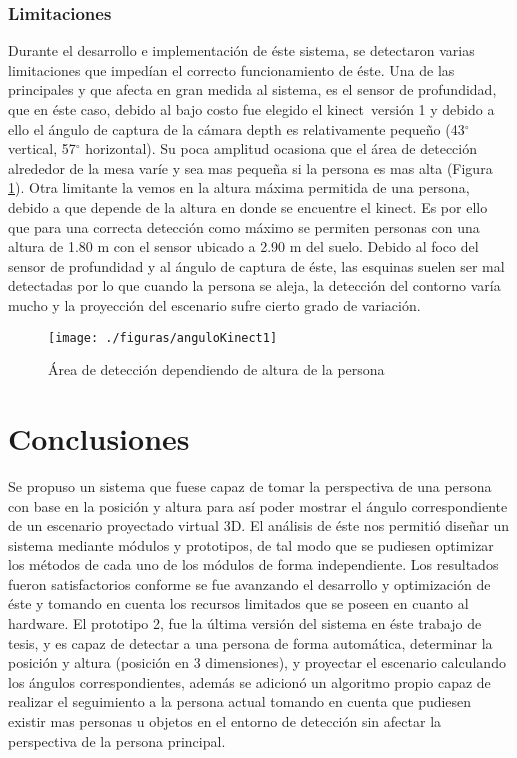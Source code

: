 \documentclass[a4paper,openright,12pt]{report}
\begin{document}
\subsection{Limitaciones}
Durante el desarrollo e implementación de éste sistema, se detectaron varias limitaciones que impedían el correcto funcionamiento de éste. Una de las principales y que afecta en gran medida al sistema, es el sensor de profundidad, que en éste caso, debido al bajo costo fue elegido el kinect\textcopyright\ versión 1 y debido a ello el ángulo de captura de la cámara depth es relativamente pequeño (43$^{\circ}$ vertical, 57$^{\circ}$ horizontal). Su poca amplitud ocasiona que el área de detección alrededor de la mesa varíe y sea mas pequeña si la persona es mas alta (Figura \ref{fig:anguloKinect1}). Otra limitante la vemos en la altura máxima permitida de una persona, debido a que depende de la altura en donde se encuentre el kinect\textcopyright. Es por ello que para una correcta detección como máximo se permiten personas con una altura de 1.80 m con el sensor ubicado a 2.90 m del suelo. Debido al foco del sensor de profundidad y al ángulo de captura de éste, las esquinas suelen ser mal detectadas por lo que cuando la persona se aleja, la detección del contorno varía mucho y la proyección del escenario sufre cierto grado de variación.
\begin{figure}[H]
	\centering
	\texttt{[image: ./figuras/anguloKinect1]}
	\caption{Área de detección dependiendo de altura de la persona}\label{fig:anguloKinect1}
\end{figure}

\chapter{Conclusiones}\label{cap.conclusiones}
Se propuso un sistema que fuese capaz de tomar la perspectiva de una persona con base en la posición y altura para así poder mostrar el ángulo correspondiente de un escenario proyectado virtual 3D. El análisis de éste nos permitió diseñar un sistema mediante módulos y prototipos, de tal modo que se pudiesen optimizar los métodos de cada uno de los módulos de forma independiente. Los resultados fueron satisfactorios conforme se fue avanzando el desarrollo y optimización de éste y tomando en cuenta los recursos limitados que se poseen en cuanto al hardware. El prototipo 2, fue la última versión del sistema en éste trabajo de tesis, y es capaz de detectar a una persona de forma automática, determinar la posición y altura (posición en 3 dimensiones), y proyectar el escenario calculando los ángulos correspondientes, además se adicionó un algoritmo propio capaz de realizar el seguimiento a la persona actual tomando en cuenta que pudiesen existir mas personas u objetos en el entorno de detección sin afectar la perspectiva de la persona principal.
\end{document}
